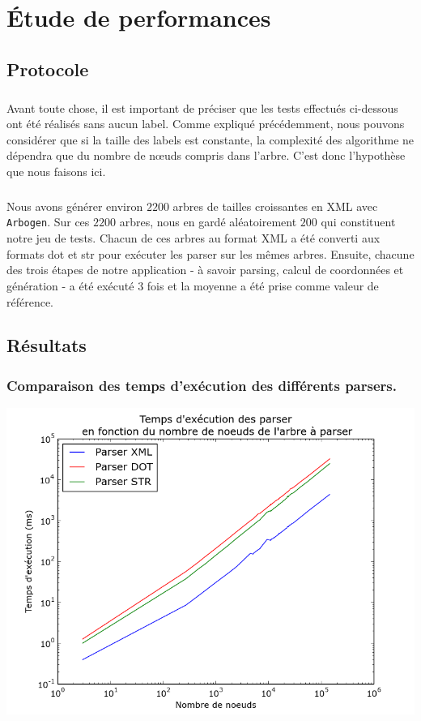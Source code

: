 \chapter{Étude de performances}

	\section{Protocole}

\paragraph{} Avant toute chose, il est important de préciser que les tests effectués ci-dessous ont été réalisés sans aucun label. Comme expliqué précédemment, nous pouvons considérer que si la taille des labels est constante, la complexité des algorithme ne dépendra que du nombre de n\oe uds compris dans l'arbre. C'est donc l'hypothèse que nous faisons ici.

\paragraph{} Nous avons générer environ $2200$ arbres de tailles croissantes en XML avec \verb|Arbogen|. Sur ces $2200$ arbres, nous en gardé aléatoirement $200$ qui constituent notre jeu de tests. Chacun de ces arbres au format XML a été converti aux formats dot et str pour exécuter les parser sur les mêmes arbres. Ensuite, chacune des trois étapes de notre application - à savoir parsing, calcul de coordonnées et génération - a été exécuté $3$ fois et la moyenne a été prise comme valeur de référence.

	\section{Résultats}

	\subsection{Comparaison des temps d'exécution des différents parsers.}
	
\begin{center}

\includegraphics[width=0.80\columnwidth]{execTimeParsers}

\end{center}

